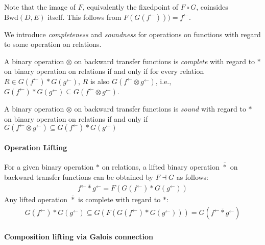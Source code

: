 \documentclass{llncs}
\newcommand{\Unidir}{\mathrm{Bwd}}
\newcommand{\fb}{{f^{\leftarrow}}}
\newcommand{\gb}{{g^{\leftarrow}}}
\newcommand{\comp}{\circ}
\newcommand{\starlift}{\mathbin{\overline{*}}}
\begin{document}
  Note that the image of $F$, equivalently the fixedpoint of $F \comp G$, coinsides $\Unidir(D , E)$ itself. This follows from $F (G (\fb))) = \fb$.

  We introduce \emph{completeness} and \emph{soundness} for operations on functions with regard to some operation on relations.
  \begin{definition}[Completeness]
   A binary operation $\otimes$ on backward transfer functions is \emph{complete} with regard to $*$ on binary operation on relations if and only if for every relation $R \in G(\fb) * G(\gb)$, $R$ is also $G (\fb \otimes \gb)$, i.e., $G(\fb) * G(\gb) \subseteq G (\fb \otimes \gb)$.
  \end{definition}

  \begin{definition}[Soundness]
  A binary operation $\otimes$ on backward transfer functions is \emph{sound} with regard to $*$ on binary operation on relations if and only if
  $G (\fb \otimes \gb) \subseteq G(\fb) * G(\gb)$
  \end{definition}

  \paragraph{Operation Lifting}
  For a given binary operation $*$ on relations, a lifted binary operation $\starlift$ on backward transfer functions can be obtained by $F \dashv G$ as follows:
  \begin{align*}
  \fb \starlift \gb = F (G(\fb) * G(\gb))
  \end{align*}
  Any lifted operation $\starlift$ is complete with regard to $*$:
  \begin{align*}
  G(\fb) * G(\gb) \subseteq G(F(G(\fb) * G(\gb))) = G(\fb \starlift \gb)
  \end{align*}


\paragraph{Composition lifting via Galois connection}
\end{document}
